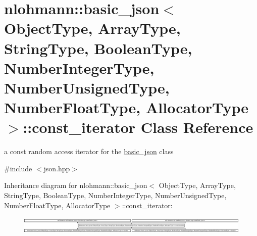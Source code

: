 \hypertarget{classnlohmann_1_1basic__json_1_1const__iterator}{\section{nlohmann\-:\-:basic\-\_\-json$<$ Object\-Type, Array\-Type, String\-Type, Boolean\-Type, Number\-Integer\-Type, Number\-Unsigned\-Type, Number\-Float\-Type, Allocator\-Type $>$\-:\-:const\-\_\-iterator Class Reference}
\label{classnlohmann_1_1basic__json_1_1const__iterator}
}


a const random access iterator for the \hyperlink{classnlohmann_1_1basic__json}{basic\-\_\-json} class  




{\ttfamily \#include $<$json.\-hpp$>$}

Inheritance diagram for nlohmann\-:\-:basic\-\_\-json$<$ Object\-Type, Array\-Type, String\-Type, Boolean\-Type, Number\-Integer\-Type, Number\-Unsigned\-Type, Number\-Float\-Type, Allocator\-Type $>$\-:\-:const\-\_\-iterator\-:\begin{figure}[H]
\begin{center}
\leavevmode
\includegraphics[height=0.852792cm]{classnlohmann_1_1basic__json_1_1const__iterator}
\end{center}
\end{figure}
